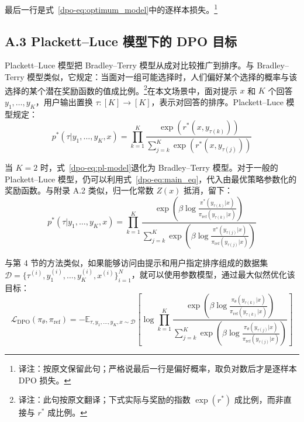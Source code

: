 最后一行是式~\ref{dpo-eq:optimum_model}中的逐样本损失。\footnote{译注：按原文保留此句；严格说最后一行是偏好概率，取负对数后才是逐样本 DPO 损失。}


\subsection*{A.3 Plackett--Luce 模型下的 DPO 目标}
Plackett--Luce 模型\cite{dpo-plackett1975analysis,dpo-luce2012individual}把 Bradley--Terry 模型从成对比较推广到排序。与 Bradley--Terry 模型类似，它规定：当面对一组可能选择时，人们偏好某个选择的概率与该选择的某个潜在奖励函数的值成比例。\footnote{译注：此句按原文翻译；下式实际与奖励的指数 $\exp(r^*)$ 成比例，而非直接与 $r^*$ 成比例。}在本文场景中，面对提示 $x$ 和 $K$ 个回答 $y_1,\ldots,y_K$，用户输出置换 $\tau:[K]\to[K]$，表示对回答的排序。Plackett--Luce 模型规定：
\begin{equation}\label{dpo-eq:pl-model}
    p^*(\tau| y_1,\ldots, y_K, x)= \prod_{k=1}^{K}\frac{\exp(r^*(x, y_{\tau(k)}))}{\sum_{j=k}^{K}\exp(r^*(x, y_{\tau(j)}))}
\end{equation}

当 $K=2$ 时，式~\ref{dpo-eq:pl-model}退化为 Bradley--Terry 模型。对于一般的 Plackett--Luce 模型，仍可以利用式~\ref{dpo-eq:main_eq}，代入由最优策略参数化的奖励函数。与附录 A.2 类似，归一化常数 $Z(x)$ 抵消，留下：
\begin{equation}\label{dpo-display-22}
    p^*(\tau| y_1,\ldots, y_K, x)= \prod_{k=1}^{K}\frac{\exp\left(\beta \log \frac{\pi^*(y_{\tau(k)}|x)}{\pi_{\mathrm{ref}}(y_{\tau(k)}|x)}\right)}{\sum_{j=k}^{K}\exp\left(\beta \log \frac{\pi^*(y_{\tau(j)}|x)}{\pi_{\mathrm{ref}}(y_{\tau(j)}|x)}\right)}
\end{equation}

与第 4 节的方法类似，如果能够访问由提示和用户指定排序组成的数据集 $\mathcal D=\{\tau^{(i)},y_1^{(i)},\ldots,y_K^{(i)},x^{(i)}\}_{i=1}^N$，就可以使用参数模型，通过最大似然优化该目标：
\begin{equation}\label{dpo-display-23}
    \mathcal{L}_{\text{DPO}}(\pi_{\theta}, \pi_{\mathrm{ref}}) = -\mathbb{E}_{\tau, y_1, \ldots, y_K, x\sim\mathcal{D}}\left[\log \prod_{k=1}^{K}\frac{\exp\left(\beta \log \frac{\pi_{\theta}(y_{\tau(k)}|x)}{\pi_{\mathrm{ref}}(y_{\tau(k)}|x)}\right)}{\sum_{j=k}^{K}\exp\left(\beta \log \frac{\pi_{\theta}(y_{\tau(j)}|x)}{\pi_{\mathrm{ref}}(y_{\tau(j)}|x)}\right)}\right]
\end{equation}



